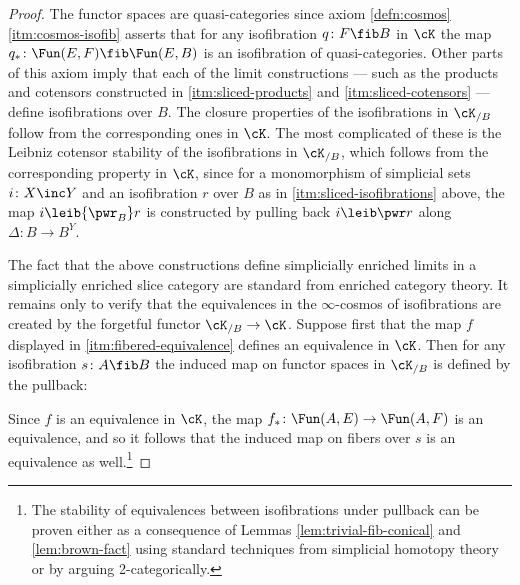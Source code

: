 \begin{proof}
The functor spaces are quasi-categories since axiom \ref{defn:cosmos}\ref{itm:cosmos-isofib} asserts that for any isofibration $q \colon F \fib B$ in $\cK$ the map $q_* \colon \Fun(E,F) \fib \Fun(E,B)$ is an isofibration of quasi-categories. Other parts of this axiom imply that each of the limit constructions --- such as the products and cotensors constructed in \ref{itm:sliced-products} and \ref{itm:sliced-cotensors} --- define isofibrations over $B$. The closure properties of the isofibrations in $\cK_{/B}$ follow from the corresponding ones in $\cK$. The most complicated of these is the Leibniz cotensor stability of the isofibrations in $\cK_{/B}$, which follows from the corresponding property in $\cK$, since for a monomorphism of simplicial sets $i \colon X\inc Y$ and an isofibration $r$ over $B$ as in \ref{itm:sliced-isofibrations} above, the map $i \leib{\pwr_B} r$ is constructed by pulling back $i \leib\pwr r$ along $\Delta \colon B \to B^Y$.

The fact that the above constructions define simplicially enriched limits in a simplicially enriched slice category are standard from enriched category theory. It remains only to verify that the equivalences in the $\infty$-cosmos of isofibrations are created by the forgetful functor $\cK_{/B} \to \cK$. Suppose first that the map $f$ displayed in \ref{itm:fibered-equivalence} defines an equivalence in $\cK$. Then for any isofibration $s \colon A \fib B$ the induced map on functor spaces in $\cK_{/B}$ is defined by the pullback:
\begin{center}
\end{center}
Since $f$ is an equivalence in $\cK$, the map $f_* \colon \Fun(A,E) \to \Fun(A,F)$ is an equivalence, and so it follows that the induced map on fibers over $s$ is an equivalence as well.\footnote{The stability of equivalences between isofibrations under pullback can be proven either as a consequence of Lemmas \ref{lem:trivial-fib-conical} and \ref{lem:brown-fact} using standard techniques from simplicial homotopy theory %
 or by arguing 2-categorically.} %


\end{proof}
